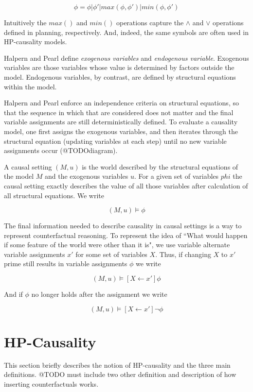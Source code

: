\documentclass{article}
\theoremstyle{plain}
\theoremstyle{definition}
\begin{document}
\[
\phi= \phi | \phi' | max(\phi, \phi') | min(\phi, \phi') 
\]

Intuitively the $max()$ and $min()$ operations capture the $\land$ and $\lor$ operations defined in planning, respectively. And, indeed, the same symbols are often used in HP-causality models.

Halpern and Pearl define \textit{exogenous variables} and \textit{endogenous variable}. Exogenous variables are those variables whose value is determined by factors outside the model. Endogenous variables, by contrast, are defined by structural equations within the model.

Halpern and Pearl enforce an independence criteria on structural equations, so that the sequence in which that are considered does not matter and the final variable assignments are still deterministically defined. To evaluate a causality model, one first assigns the exogenous variables, and then iterates through the structural equation (updating variables at each step) until no new variable assignments occur (@TODOdiagram).

A causal setting $(M,u)$ is the world described by the structural equations of the model $M$ and the exogenous variables $u$. For a given set of variables $phi$ the causal setting exactly describes the value of all those variables after calculation of all structural equations. We write

\[
(M,u) \models \phi
\]

The final information needed to describe causality in causal settings is a way to represent counterfactual reasoning. To represent the idea of ``What would happen if some feature of the world were other than it is", we use variable alternate variable assignments $x'$ for some set of variables $X$. Thus, if changing $X$ to $x'$ prime still results in variable assignments $\phi$ we write

\[
(M,u)\models [X\leftarrow x']\phi
\]

And if $\phi$ no longer holds after the assignment we write

\[
(M,u)\models [X\leftarrow x']\lnot \phi
\]

\section{HP-Causality}
This section briefly describes the notion of HP-causality and the three main definitions. @TODO must include two other definition and description of how inserting counterfactuals works.
\end{document}

